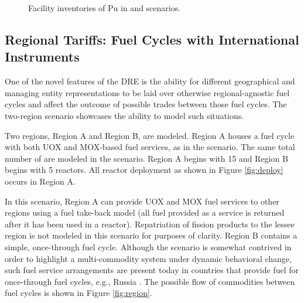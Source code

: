 \begin{figure}
  \centering
  \begin{minipage}{0.67\textwidth}
    \centering 
    \vfill 
  \end{minipage}%
  \begin{minipage}{0.33\textwidth}
    \centering
  \end{minipage}%
  \caption[]{
    \label{fig:military}
    Facility inventories of Pu in \basecase and \external scenarios.}
\end{figure}

\subsection{Regional Tariffs: Fuel Cycles with International Instruments}

One of the novel features of the DRE is the ability for different geographical
and managing entity representations to be laid over otherwise regional-agnostic
fuel cycles and affect the outcome of possible trades between those fuel
cycles. The \tariff two-region scenario showcases the ability to model
such situations.

Two regions, Region A and Region B, are modeled. Region A houses a fuel cycle
with both UOX and MOX-based fuel services, as in the \basecase scenario. The
same total number of \reactors are modeled in the scenario. Region A begins with
15 \reactors and Region B begins with 5 reactors. All reactor deployment as
shown in Figure \ref{fig:deploy} occurs in Region A.

In this scenario, Region A can provide UOX and MOX fuel services to other
regions using a fuel take-back model (all fuel provided as a service is returned
after it has been used in a reactor). Repatriation of fission products to the
lessee region is not modeled in this scenario for purposes of clarity. Region B
contains a simple, once-through fuel cycle. Although the scenario is somewhat
contrived in order to highlight a multi-commodity system under dynamic
behavioral change, such fuel service arrangements are present today in countries
that provide fuel for once-through fuel cycles, e.g., Russia
\cite{wnarussia2016}. The possible flow of commodities between fuel cycles is
shown in Figure \ref{fig:region}.

